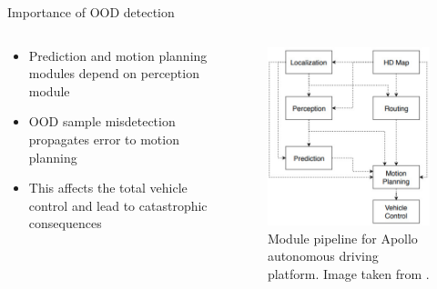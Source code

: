\documentclass[aspectratio=169]{beamer}
\begin{document}
\begin{frame}{Importance of OOD detection}
    \begin{columns}
       \begin{column}{0.5\textwidth}
        \begin{itemize}
            \item Prediction and motion planning modules depend on perception module
            \item OOD sample misdetection propagates error to motion planning
            \item This affects the total vehicle control and lead to catastrophic consequences
        \end{itemize}
       \end{column}
       \begin{column}{0.5\textwidth}
            \begin{figure}
                \centering
                \includegraphics[scale=0.35]{images/apollo_pipeline.jpg}
                \caption{Module pipeline for Apollo autonomous driving platform. Image taken from \cite{baiduapollo}.}
                \label{fig:eg_apollo_pipeline}
            \end{figure}
       \end{column}
    \end{columns}
\end{frame}
\end{document}
